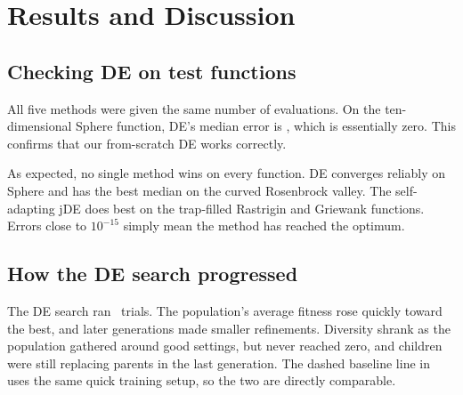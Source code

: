 \chapter{Results and Discussion}
\section{Checking DE on test functions}
All five methods were given the same number of evaluations. On the ten-dimensional Sphere function, DE's median error is \SphereDE, which is essentially zero. This confirms that our from-scratch DE works correctly.



As expected, no single method wins on every function. DE converges reliably on Sphere and has the best median on the curved Rosenbrock valley. The self-adapting jDE does best on the trap-filled Rastrigin and Griewank functions. Errors close to $10^{-15}$ simply mean the method has reached the optimum.


\section{How the DE search progressed}
The DE search ran \NumEvals\ trials. The population's average fitness rose quickly toward the best, and later generations made smaller refinements. Diversity shrank as the population gathered around good settings, but never reached zero, and children were still replacing parents in the last generation. The dashed baseline line in  uses the same quick training setup, so the two are directly comparable.


